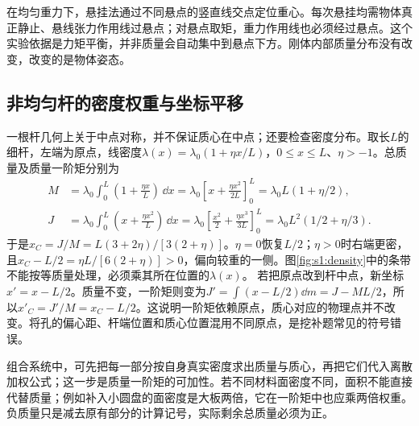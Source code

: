 在均匀重力下，悬挂法通过不同悬点的竖直线交点定位重心。每次悬挂均需物体真正静止、悬线张力作用线过悬点；对悬点取矩，重力作用线也必须经过悬点。这个实验依据是力矩平衡，并非质量会自动集中到悬点下方。刚体内部质量分布没有改变，改变的是物体姿态。


\subsection{非均匀杆的密度权重与坐标平移}
一根杆几何上关于中点对称，并不保证质心在中点；还要检查密度分布。取长$L$的细杆，左端为原点，线密度$\lambda(x)=\lambda_0(1+\eta x/L)$，$0\le x\le L$、$\eta>-1$。总质量及质量一阶矩分别为
\[
\begin{aligned}
M&=\lambda_0\int_0^L\left(1+\frac{\eta x}{L}\right)\,\dd x
=\lambda_0\left[x+\frac{\eta x^2}{2L}\right]_0^L
=\lambda_0L(1+\eta/2),\\
J&=\lambda_0\int_0^L\left(x+\frac{\eta x^2}{L}\right)\,\dd x
=\lambda_0\left[\frac{x^2}{2}+\frac{\eta x^3}{3L}\right]_0^L
=\lambda_0L^2(1/2+\eta/3).
\end{aligned}
\]
于是$x_C=J/M=L(3+2\eta)/[3(2+\eta)]$。$\eta=0$恢复$L/2$；$\eta>0$时右端更密，且$x_C-L/2=\eta L/[6(2+\eta)]>0$，偏向较重的一侧。图\ref{fig:s1:density}中的条带不能按等质量处理，必须乘其所在位置的$\lambda(x)$。
若把原点改到杆中点，新坐标$x'=x-L/2$。质量不变，一阶矩则变为$J'=\int(x-L/2)\dd m=J-ML/2$，所以$x'_C=J'/M=x_C-L/2$。这说明一阶矩依赖原点，质心对应的物理点并不改变。将孔的偏心距、杆端位置和质心位置混用不同原点，是挖补题常见的符号错误。

组合系统中，可先把每一部分按自身真实密度求出质量与质心，再把它们代入离散加权公式；这一步是质量一阶矩的可加性。若不同材料面密度不同，面积不能直接代替质量；例如补入小圆盘的面密度是大板两倍，它在一阶矩中也应乘两倍权重。负质量只是减去原有部分的计算记号，实际剩余总质量必须为正。

